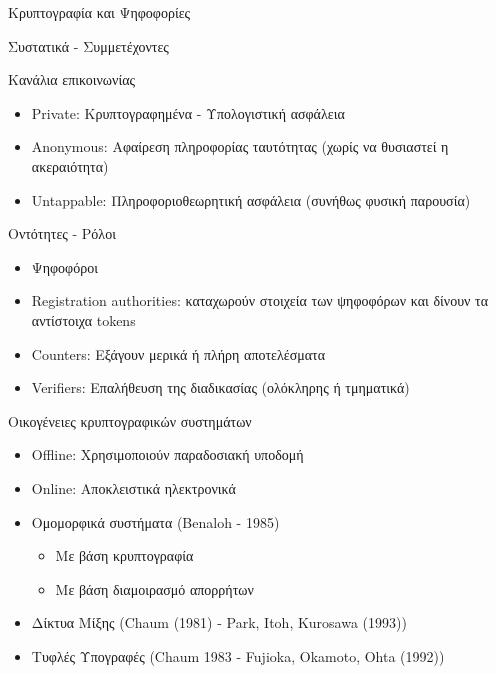 \documentclass[handout]{beamer}
\begin{document}
\begin{section}{Κρυπτογραφία και Ψηφοφορίες}
\begin{frame}[allowframebreaks]{Συστατικά - Συμμετέχοντες}
\framebreak

\begin{block}{Κανάλια επικοινωνίας}
\begin{itemize}
  \item Private: Κρυπτογραφημένα - Υπολογιστική ασφάλεια 
  \item Anonymous: Αφαίρεση πληροφορίας ταυτότητας (χωρίς να θυσιαστεί η ακεραιότητα) 
  \item Untappable: Πληροφοριοθεωρητική ασφάλεια (συνήθως φυσική παρουσία)
\end{itemize}
\end{block}


\framebreak

\begin{block}{Οντότητες - Ρόλοι}
\begin{itemize}
\item Ψηφοφόροι 
\item Registration authorities: καταχωρούν στοιχεία των ψηφοφόρων και δίνουν τα αντίστοιχα tokens 
\item Counters: Εξάγουν μερικά ή πλήρη αποτελέσματα 
\item Verifiers: Επαλήθευση της  διαδικασίας (ολόκληρης ή τμηματικά)
\end{itemize}
\end{block}

\end{frame}

\begin{frame}{Οικογένειες κρυπτογραφικών συστημάτων}
\begin{itemize}
\item Offline: Χρησιμοποιούν παραδοσιακή υποδομή \pause 
\item Online: Αποκλειστικά ηλεκτρονικά \pause 
\end{itemize}

\begin{itemize}
    \item Ομομορφικά συστήματα (Benaloh - 1985) \pause 
    \begin{itemize}
        \item Με βάση κρυπτογραφία
        \item Με βάση διαμοιρασμό απορρήτων
    \end{itemize} \pause 
    \item Δίκτυα Μίξης (Chaum (1981) - Park, Itoh, Kurosawa (1993)) \pause 
    \item Τυφλές Υπογραφές (Chaum 1983 - Fujioka, Okamoto, Ohta (1992))
\end{itemize}
\end{frame}


\end{section}
\end{document}
